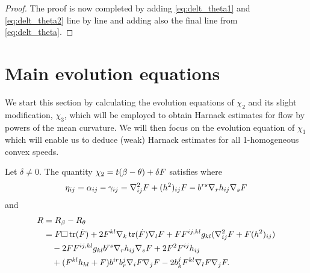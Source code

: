 \documentclass{amsart}
\begin{document}
\begin{proof}
The proof is now completed by adding \cref{eq:delt_theta1} and \cref{eq:delt_theta2} line by line and adding also the final line from \cref{eq:delt_theta}.
\end{proof}

\section{Main evolution equations}
\label{sec:main_evolution}

We start this section by calculating the evolution equations of $\chi_2$ and its slight modification, $\chi_3$, which will be employed to obtain Harnack estimates for flow by powers of the mean curvature. We will then focus on the evolution equation of $\chi_1$ which will enable us to deduce (weak) Harnack estimates for all 1-homogeneous convex speeds.
\begin{proposition}
\label{thm:Evchi}
Let $\delta \neq 0.$ The quantity
$
\chi_2 = t(\beta - \theta) + \delta F
$
satisfies
where
\[
\eta_{ij} = \alpha_{ij} - \gamma_{ij} = \nabla^2_{ij}F + (h^2)_{ij}F - b^{rs}\nabla_r h_{ij}\nabla_s F
\]
and
\[
\begin{split}
R &= R_{\beta} - R_{\theta} \\
&= F \Box \operatorname{tr}(\dot{F}) + 2F^{kl} \nabla_k \operatorname{tr}(\dot{F}) \nabla_l F + F F^{ij,kl}g_{kl} (\nabla^2_{ij} F + F(h^2)_{ij})\\ 
&\quad- 2F F^{ij,kl}g_{kl} b^{rs}\nabla_r h_{ij}\nabla_s F + 2F^{2}F^{ij}h_{ij}\\
&\quad  +(F^{kl}h_{kl} + F)b^{ir}b^{j}_{r}\nabla_i F\nabla_jF - 2 b^{j}_{k}F^{kl}\nabla_lF\nabla_jF.
\end{split}
\]
\end{proposition}
\end{document}
